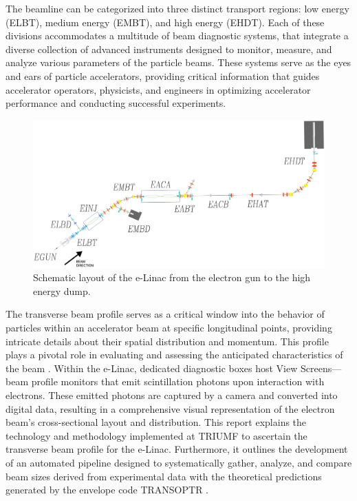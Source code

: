 \documentclass{article}
\begin{document}
The beamline can be categorized into three distinct transport regions: low energy (ELBT), medium energy (EMBT), and high energy (EHDT). Each of these divisions accommodates a multitude of beam diagnostic systems, that integrate a diverse collection of advanced instruments designed to monitor, measure, and analyze various parameters of the particle beams. These systems serve as the eyes and ears of particle accelerators, providing critical information that guides accelerator operators, physicists, and engineers in optimizing accelerator performance and conducting successful experiments. \\

\begin{figure}[h!]
    \centering
    \includegraphics[width=\textwidth]{images/beam_line4.png}
    \caption{Schematic layout of the e-Linac from the electron gun to the high energy dump.}
    \label{fig:layout}
\end{figure}
     The transverse beam profile serves as a critical window into the behavior of particles within an accelerator beam at specific longitudinal points, providing intricate details about their spatial distribution and momentum. This profile plays a pivotal role in evaluating and assessing the anticipated characteristics of the beam \cite{storey2011view}. Within the e-Linac, dedicated diagnostic boxes host View Screens—beam profile monitors that emit scintillation photons upon interaction with electrons. These emitted photons are captured by a camera and converted into digital data, resulting in a comprehensive visual representation of the electron beam's cross-sectional layout and distribution. This report explains the technology and methodology implemented at TRIUMF to ascertain the transverse beam profile for the e-Linac. Furthermore, it outlines the development of an automated pipeline designed to systematically gather, analyze, and compare beam sizes derived from experimental data with the theoretical predictions generated by the envelope code TRANSOPTR \cite{baartman2016transoptr}.
\end{document}
